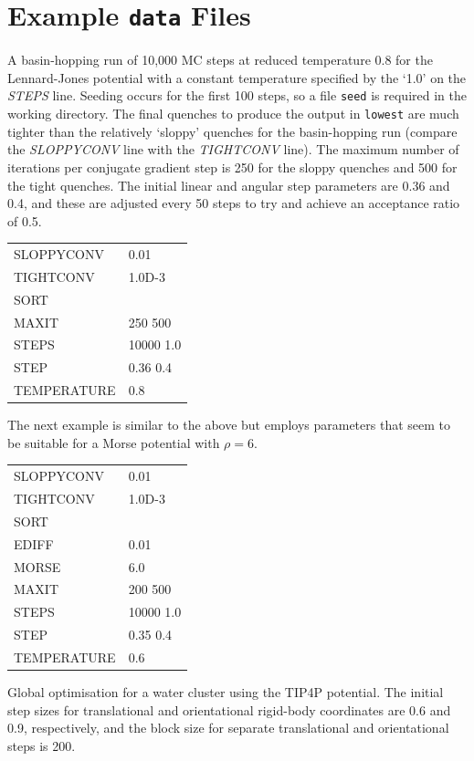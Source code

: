 \documentclass[12pt,a4paper,dvips]{article}
\begin{document}

\section{Example {\tt data} Files}

A basin-hopping run of 10,000 MC steps at reduced temperature $0.8$ for the Lennard-Jones potential
with a constant temperature specified by the `1.0' on the {\it STEPS\/} line.
Seeding occurs for the first 100 steps, so a file {\tt seed} is required in the 
working directory. The final quenches to produce the output in {\tt lowest} are much
tighter than the relatively `sloppy' quenches for the basin-hopping run (compare the
{\it SLOPPYCONV\/} line with the {\it TIGHTCONV\/} line). The maximum number of iterations per
conjugate gradient step is 250 for the sloppy quenches and 500 for the tight quenches.
The initial linear and angular step parameters are 0.36 and 0.4, and these are adjusted
every 50 steps to try and achieve an acceptance ratio of 0.5.

\medskip
\begin{tabular}{ll}
SLOPPYCONV & 0.01 \\
TIGHTCONV & 1.0D-3 \\
SORT \\
MAXIT & 250 500 \\
STEPS & 10000 1.0 \\
STEP & 0.36 0.4 \\
TEMPERATURE & 0.8 \\
\end{tabular}
\medskip

\noindent The next example is similar to the above but employs parameters that seem
to be suitable for a Morse potential with $\rho=6$.

\medskip
\begin{tabular}{ll}
SLOPPYCONV & 0.01 \\
TIGHTCONV & 1.0D-3 \\
SORT \\
EDIFF & 0.01\\
MORSE & 6.0\\
MAXIT & 200 500\\
STEPS & 10000 1.0\\
STEP & 0.35 0.4\\
TEMPERATURE & 0.6\\
\end{tabular}
\medskip

\noindent Global optimisation for a water cluster using the TIP4P potential.
The initial step sizes for translational and orientational rigid-body coordinates are
0.6 and 0.9, respectively, and the block size for separate translational and orientational
steps is 200.
\end{document}

